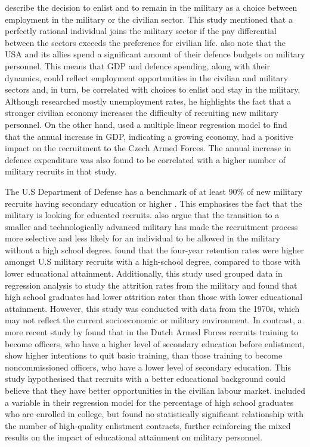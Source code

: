 \textcite{warner_chapter_1995} describe the decision to enlist and to remain in the military as a choice between employment in the military or the civilian sector. 
This study mentioned that a perfectly rational individual joins the military sector if the pay differential between the sectors exceeds the preference for civilian life.
\textcite{warner_chapter_1995} also note that the USA and its allies spend a significant amount of their defence budgets on military personnel. 
This means that GDP and defence spending, along with their dynamics, could reflect employment opportunities in the civilian and military sectors and, in turn, be correlated with choices to enlist and stay in the military.
Although \textcite{backstrom_are_2019} researched mostly unemployment rates, he highlights the fact that a stronger civilian economy increases the difficulty of recruiting new military personnel. 
On the other hand, \textcite{holcner_military_2021} used a multiple linear regression model to find that the annual increase in GDP, indicating a growing economy, had a positive impact on the recruitment to the Czech Armed Forces. 
The annual increase in defence expenditure was also found to be 
correlated with a higher number of military recruits in that study.

The U.S Department of Defense has a benchmark of at least 90\% of new military recruits having secondary education or higher \parencite{cnas_resources_and_force_readiness_division_fiscal_nodate}.
This emphasises the fact that the military is looking for educated recruits.
\textcite{asoni_rich_2013} also argue that the transition to a smaller and technologically advanced military has made the recruitment process more selective and less likely for an individual to 
be allowed in the military without a high school degree. 
\textcite{elster_study_1982} found that the four-year retention rates were higher amongst U.S military recruits with a high-school degree, compared to those with lower educational attainment.
Additionally, this study used grouped data in regression analysis to study the attrition rates from the military and found that high school graduates had lower attrition rates than those with lower educational attainment.
However, this study was conducted with data from the 1970s, which may not reflect the current socioeconomic or military environment. 
In contrast, a more recent study by \textcite{hof_quality_2023} found that in the Dutch Armed Forces recruits training to become officers, who have a higher level of secondary education before enlistment, show higher intentions to quit basic training, than those training to become noncommissioned officers, who have a lower level of secondary education. 
This study hypothesised that recruits with a better educational background could believe that they have better opportunities in the civilian labour market.
\textcite{asch_cash_2010} included a variable in their regression model for the percentage of high school graduates who are enrolled in college, but found no statistically significant relationship with the number of high-quality enlistment contracts, further reinforcing the mixed results on the impact of educational attainment on military personnel.

